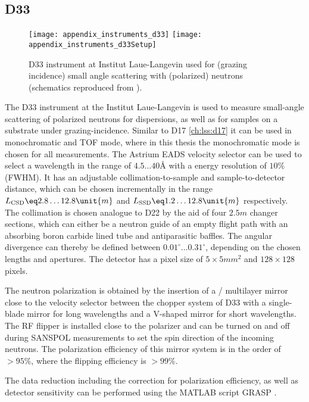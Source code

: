 \documentclass[\main/dresen_thesis.tex]{subfiles}
\begin{document}
  \subsection{D33}\label{ch:lss:d33}
    \begin{figure}[ht]
      \centering
      \texttt{[image: appendix\_instruments\_d33]}
      \texttt{[image: appendix\_instruments\_d33Setup]}
      \caption{\label{fig:lss:d33}D33 instrument at Institut Laue-Langevin used for (grazing incidence) small angle scattering with (polarized) neutrons (schematics reproduced from \cite{Dewhurst_2015_Thesm}).}
    \end{figure}
    The D33 instrument \cite{Dewhurst_2015_Thesm} at the Institut Laue-Langevin is used to measure small-angle scattering of polarized neutrons for dispersions, as well as for samples on a substrate under grazing-incidence.
    Similar to D17 \ref{ch:lss:d17} it can be used in monochromatic and TOF mode, where in this thesis the monochromatic mode is chosen for all measurements.
    The Astrium EADS velocity selector can be used to select a wavelength in the range of $4.5 \ldots 40 \unit{\angstrom}$ with a energy resolution of $10 \unit{\%}$ (FWHM).
    It has an adjustable collimation-to-sample and sample-to-detector distance, which can be chosen incrementally in the range $L_\mathrm{CSD} \eq 2.8 \ldots 12.8 \unit{m}$ and $L_\mathrm{SSD} \eq 1.2 \ldots 12.8 \unit{m}$ respectively.
    The collimation is chosen analogue to D22 by the aid of four $2.5 \unit{m}$ changer sections, which can either be a neutron guide of an empty flight path with an absorbing boron carbide lined tube and antiparasitic baffles.
    The angular divergence can thereby be defined between $0.01^\circ \ldots 0.31^\circ$, depending on the chosen lengths and apertures.
    The detector has a pixel size of $5 \times 5 \unit{mm^2}$ and $128 \times 128$ pixels.

    The neutron polarization is obtained by the insertion of a / multilayer mirror close to the velocity selector between the chopper system of D33 with a single-blade mirror for long wavelengths and a V-shaped mirror for short wavelengths.
    The RF flipper is installed close to the polarizer and can be turned on and off during SANSPOL measurements to set the spin direction of the incoming neutrons.
    The polarization efficiency of this mirror system is in the order of $>95 \unit{\%}$, where the flipping efficiency is $>99 \unit{\%}$.

    The data reduction including the correction for polarization efficiency, as well as detector sensitivity can be performed using the MATLAB script GRASP \cite{Dewhurst_2003_Grasp}.
\end{document}
